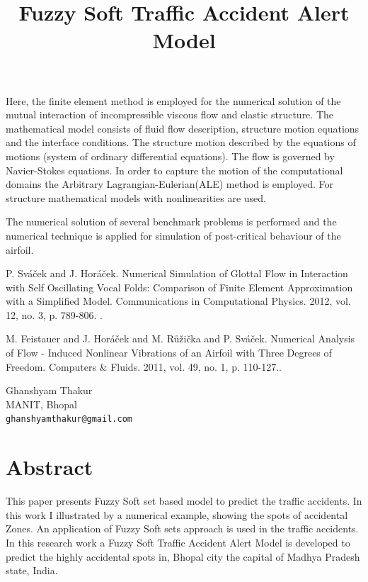 \documentclass[article, A4, 11pt]{llncs}%
\begin{document}
Here, the  finite element method is  employed for the numerical solution of the mutual interaction of incompressible viscous flow and elastic structure. The mathematical model consists of fluid flow description, structure motion equations and the interface conditions. The structure motion described by the equations of motions (system of ordinary differential equations). The flow is governed by Navier-Stokes  equations. In order to capture the motion of the computational domains the Arbitrary Lagrangian-Eulerian(ALE) method is employed. For structure mathematical models with nonlinearities are used. 

The numerical solution of several benchmark problems is performed and the numerical technique is applied for simulation of post-critical behaviour of the airfoil.



\begin{thebibliography}{10}
{\sc P. Sváček and J. Horáček}. {Numerical Simulation of Glottal Flow in Interaction with Self Oscillating Vocal Folds: Comparison of Finite Element Approximation with a Simplified Model}. Communications in Computational Physics. 2012, vol. 12, no. 3, p. 789-806. .

{\sc M. Feistauer and J. Horáček and M. Růžička and P. Sváček}. {Numerical Analysis of Flow - Induced Nonlinear Vibrations of an Airfoil with Three Degrees of Freedom}. Computers \& Fluids. 2011, vol. 49, no. 1, p. 110-127..
\end{thebibliography} %

\title{Fuzzy Soft Traffic Accident Alert Model}
 \author{} \institute{}
\maketitle
\begin{center}
{\large Ghanshyam Thakur}\\
MANIT, Bhopal\\
{\tt ghanshyamthakur@gmail.com}
\end{center}

\section*{Abstract}
This paper presents Fuzzy Soft set based model to predict the traffic accidents. In this work I illustrated by a numerical example, showing the spots of accidental Zones. An application of Fuzzy Soft sets approach is used in the traffic accidents. In this research work a Fuzzy Soft Traffic Accident Alert Model is developed to predict the highly accidental spots in, Bhopal city the capital of Madhya Pradesh state, India.
\end{document}

